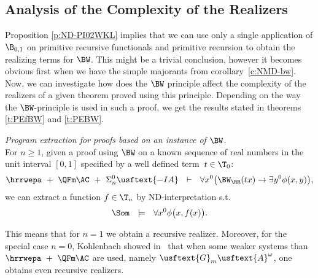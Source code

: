 \subsection {Analysis of the Complexity of the Realizers} \label{ss:acr}
\newcommand{\tn}{$t\in\T_n$}
\newcommand{\tsn}{$t\in\T_0$}

Proposition \ref{p:ND-PI02WKL} implies that we can use only a single
application of $\B_{0,1}$ on primitive recursive functionals
and primitive recursion to obtain the realizing terms for $\BW$. This might
be a trivial conclusion, however it becomes obvious first when we have the
simple majorants from corollary~\ref{c:NMD-bw}.\\
Now, we can investigate how does the $\BW$ principle affect the
complexity of the realizers of a given theorem proved using this principle.
Depending on the way the $\BW$-principle is used in such a proof, 
we get the results stated in theorems \ref{t:PEfBW} and \ref{t:PEBW}.\\
%
\begin{thm}{\em Program extraction for proofs based on an instance of $\BW$.\\} 
\label{t:PEfBW}
For $n\geq1$, given a proof 
using $\BW$ on a known sequence of real numbers in the unit interval $[0,1]$ 
specified by a well defined term~\tsn:
\[
\hrrwepa\ +\ \QFm\AC\ +\ \Sigma^0_n\usftext{-IA}\ \ \vdash\ \ 
    \forall x^0\big(\BW_\RR(tx)\rightarrow\exists y^0 \phi(x,y)\big)\text{,}
\]
we can extract a function $f\in\T_n$ by ND-interpretation s.t.
\[
\Som\ \ \models\ \ \forall x^0 \phi\big(x,f(x)\big) \text{.}
\]
\end{thm}
%
%
\begin{rmk}
This means that for $n=1$ we obtain a \lOrdm{\omega^{\omega^\omega}}recursive realizer.
Moreover, for the special case $n=0$, Kohlenbach showed in~\cite{Kohlenbach98} that when some weaker systems
than $\hrrwepa\ +\ \QFm\AC$ are used, namely $\usftext{G}_m\usftext{A}^\omega$,
one obtains even \lOrdm{\omega^\omega}recursive realizers.\\
\end{rmk}
%
%
